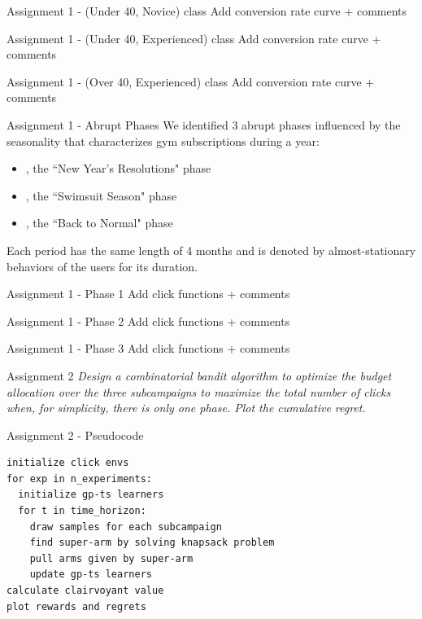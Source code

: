 \documentclass[11pt]{beamer}
\begin{document}
\begin{frame}{Assignment 1 - (Under 40, Novice) class}
Add conversion rate curve + comments
\end{frame}

\begin{frame}{Assignment 1 - (Under 40, Experienced) class}
Add conversion rate curve + comments
\end{frame}

\begin{frame}{Assignment 1 - (Over 40, Experienced) class}
Add conversion rate curve + comments
\end{frame}

\begin{frame}{Assignment 1 - Abrupt Phases}
We identified 3 abrupt phases influenced by the seasonality that characterizes gym subscriptions during a year:
\begin{itemize}
\item [1.] [January-April], the ``New Year's Resolutions" phase
\item [2.] [May-August], the ``Swimsuit Season" phase
\item [3.] [September-December], the ``Back to Normal" phase
\end{itemize}
\end{frame}
Each period has the same length of 4 months and is denoted by almost-stationary behaviors of the users for its duration.  

\begin{frame}{Assignment 1 - Phase 1}
Add click functions + comments
\end{frame}

\begin{frame}{Assignment 1 - Phase 2}
Add click functions + comments
\end{frame}

\begin{frame}{Assignment 1 - Phase 3}
Add click functions + comments
\end{frame}

\begin{frame}{Assignment 2}
\textit{Design a combinatorial bandit algorithm to optimize the budget allocation over the three subcampaigns to maximize the total number of clicks when, for simplicity, there is only one phase. Plot the cumulative regret.}
\end{frame}

\begin{frame}[fragile]{Assignment 2 - Pseudocode}
\begin{lstlisting}
initialize click envs
for exp in n_experiments:
  initialize gp-ts learners
  for t in time_horizon:
    draw samples for each subcampaign
    find super-arm by solving knapsack problem
    pull arms given by super-arm
    update gp-ts learners
calculate clairvoyant value
plot rewards and regrets
\end{lstlisting}
\end{frame}
\end{document}
